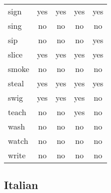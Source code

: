 \begin{longtable}{lc|ccc}
sign      & yes      & yes    & yes         & yes         \\
sing      & no       & no     & no          & no          \\
sip       & no       & no     & no          & yes         \\
slice     & yes      & yes    & yes         & yes         \\
smoke     & no       & no     & no          & no          \\
steal     & yes      & yes    & yes         & yes         \\
swig      & yes      & yes    & yes         & no          \\
teach     & no       & no     & yes         & no          \\
wash      & no       & no     & no          & no          \\
watch     & no       & no     & no          & no          \\
write     & no       & no     & no          & no         
\end{longtable}


\subsection{Italian}

